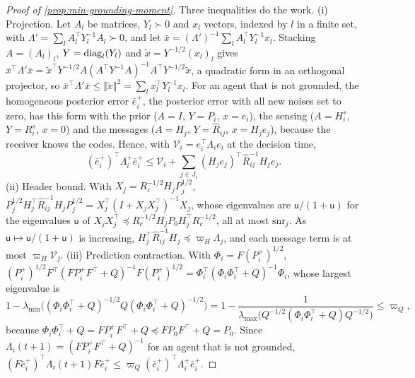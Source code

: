 \begin{proof}[Proof of \cref{prop:min-grounding-moment}]
Three inequalities do the work. (i) Projection. Let $A_l$ be matrices, $Y_l\succ0$ and $x_l$ vectors, indexed by $l$ in a finite set, with $\Lambda'=\sum_lA_l^\top Y_l^{-1}A_l\succ0$, and let $\bar x=(\Lambda')^{-1}\sum_lA_l^\top Y_l^{-1}x_l$. Stacking $A=(A_l)_l$, $Y=\operatorname{diag}_l(Y_l)$ and $\tilde x=Y^{-1/2}(x_l)_l$ gives $\bar x^\top\Lambda'\bar x=\tilde x^\top Y^{-1/2}A(A^\top Y^{-1}A)^{-1}A^\top Y^{-1/2}\tilde x$, a quadratic form in an orthogonal projector, so $\bar x^\top\Lambda'\bar x\le\Vert\tilde x\Vert^2=\sum_lx_l^\top Y_l^{-1}x_l$. For an agent that is not grounded, the homogeneous posterior error $\bar e^+_i$, the posterior error with all new noises set to zero, has this form with the prior ($A=I$, $Y=P_i$, $x=e_i$), the sensing ($A=H^s_i$, $Y=R^s_i$, $x=0$) and the messages ($A=H_j$, $Y=\hat R_{ij}$, $x=H_je_j$), because the receiver knows the codes. Hence, with $\mathcal V_i=e_i^\top\Lambda_ie_i$ at the decision time,
\[
(\bar e^+_i)^\top\Lambda^+_i\bar e^+_i\le\mathcal V_i+\sum_{j\in J_i}(H_je_j)^\top\hat R_{ij}^{-1}H_je_j.
\]
(ii) Header bound. With $X_j=R_c^{-1/2}H_jP_j^{1/2}$, $P_j^{1/2}H_j^\top\hat R_{ij}^{-1}H_jP_j^{1/2}=X_j^\top(I+X_jX_j^\top)^{-1}X_j$, whose eigenvalues are $\mathsf u/(1+\mathsf u)$ for the eigenvalues $\mathsf u$ of $X_jX_j^\top\preceq R_c^{-1/2}H_jP_0H_j^\top R_c^{-1/2}$, all at most $\mathrm{snr}_j$. As $\mathsf u\mapsto\mathsf u/(1+\mathsf u)$ is increasing, $H_j^\top\hat R_{ij}^{-1}H_j\preceq\varpi_H\Lambda_j$, and each message term is at most $\varpi_H\mathcal V_j$. (iii) Prediction contraction. With $\Phi_i=F(P^+_i)^{1/2}$, $(P^+_i)^{1/2}F^\top(FP^+_iF^\top+Q)^{-1}F(P^+_i)^{1/2}=\Phi_i^\top(\Phi_i\Phi_i^\top+Q)^{-1}\Phi_i$, whose largest eigenvalue is
\[
1-\lambda_{\min}\bigl((\Phi_i\Phi_i^\top+Q)^{-1/2}Q(\Phi_i\Phi_i^\top+Q)^{-1/2}\bigr)=1-\frac{1}{\lambda_{\max}\bigl(Q^{-1/2}(\Phi_i\Phi_i^\top+Q)Q^{-1/2}\bigr)}\le\varpi_Q,
\]
because $\Phi_i\Phi_i^\top+Q=FP^+_iF^\top+Q\preceq FP_0F^\top+Q=P_0$. Since $\Lambda_i(t+1)=(FP^+_iF^\top+Q)^{-1}$ for an agent that is not grounded, $(F\bar e^+_i)^\top\Lambda_i(t+1)F\bar e^+_i\le\varpi_Q(\bar e^+_i)^\top\Lambda^+_i\bar e^+_i$.


\end{proof}
